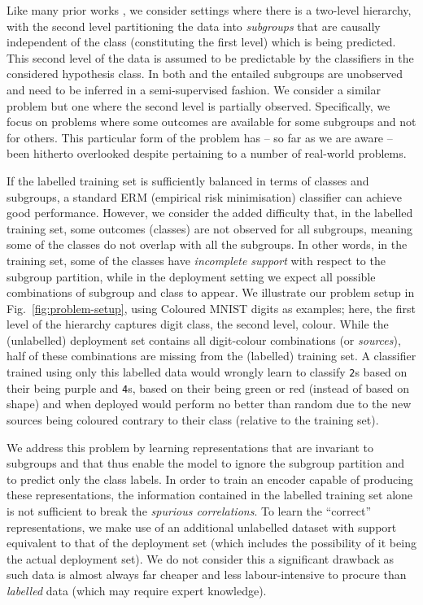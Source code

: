 Like many prior works
\citep{SohDunAngGuetal20,kim2019learning,creager2021environment,SagRagKohLia20}, we consider
settings where there is a two-level hierarchy, with the second level partitioning the data into
\emph{subgroups} that are causally independent of the class (constituting the first level) which is
being predicted. 
%
This second level of the data is assumed to be predictable by the classifiers in the considered
hypothesis class. 
%
In both \citet{SohDunAngGuetal20} and \citet{creager2019flexibly} the entailed subgroups are
unobserved and need to be inferred in a semi-supervised fashion. We consider a similar problem but
one where the second level is partially observed.
%
Specifically, we focus on problems where some outcomes are available for some subgroups and not for
others. 
%
This particular form of the problem has -- so far as we are aware -- been hitherto overlooked
despite pertaining to a number of real-world problems.

%
If the labelled training set is sufficiently balanced in terms of classes and subgroups, a standard
ERM (empirical risk minimisation) classifier can achieve good performance.
%
However, we consider the added difficulty that, in the labelled training set, some outcomes
(classes) are not observed for all subgroups, meaning some of the classes do not overlap with all
the subgroups.
%
In other words, in the training set, some of the classes have \emph{incomplete support} with
respect to the subgroup partition, while in the deployment setting we expect all possible
combinations of subgroup and class to appear.
%
We illustrate our problem setup in Fig.~\ref{fig:problem-setup}, using Coloured MNIST digits as
examples; here, the first level of the hierarchy captures digit class, the second level, colour. 
%
While the (unlabelled) deployment set contains all digit-colour combinations (or \emph{sources}),
half of these combinations are missing from the (labelled) training set. 
%
A classifier trained using only this labelled data would wrongly learn to classify \texttt{2}s based
on their being {\color{purple}purple} and \texttt{4}s, based on their being {\color{green}green} or
{\color{red}red} (instead of based on shape) and when deployed would perform no better than random
due to the new sources being coloured contrary to their class (relative to the training set).

We address this problem by learning representations that are invariant to subgroups and that thus
enable the model to ignore the subgroup partition and to predict only the class labels.
%
In order to train an encoder capable of producing these representations, the information contained
in the labelled training set alone is not sufficient to break the \emph{spurious correlations}.
%
To learn the ``correct'' representations, we make use of an additional unlabelled dataset with
support equivalent to that of the deployment set (which includes the possibility of it being the
actual deployment set).
%
We do not consider this a significant drawback as such data is almost always far cheaper and less
labour-intensive to procure than \emph{labelled} data (which may require expert knowledge).
%

